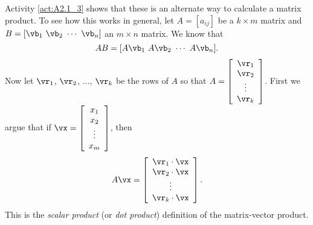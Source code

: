 Activity \ref{act:A2.1_3} shows that these is an alternate way to calculate a matrix product. To see how this works in general, let $A = [a_{ij}]$ be a $k \times m$ matrix and $B = [\vb_1 \ \vb_2 \ \cdots \ \vb_n]$ an $m \times n$ matrix. We know that
\[AB = [A\vb_1 \ A\vb_2 \ \cdots \ A\vb_n].\]
Now let $\vr_1$, $\vr_2$, $\ldots$, $\vr_k$ be the rows of $A$ so that $A = \left[ \begin{array}{c} \vr_1 \\ \vr_2 \\ \vdots \\ \vr_k \end{array} \right]$. First we argue that if $\vx = \left[ \begin{array}{c} x_1 \\ x_2 \\ \vdots \\ x_m \end{array} \right]$, then 
\[A \vx = \left[ \begin{array}{c} \vr_1 \cdot \vx \\ \vr_2 \cdot \vx \\ \vdots \\ \vr_k \cdot \vx \end{array} \right].\]
This is the \emph{scalar product} (or \emph{dot product}) definition of the matrix-vector product.

